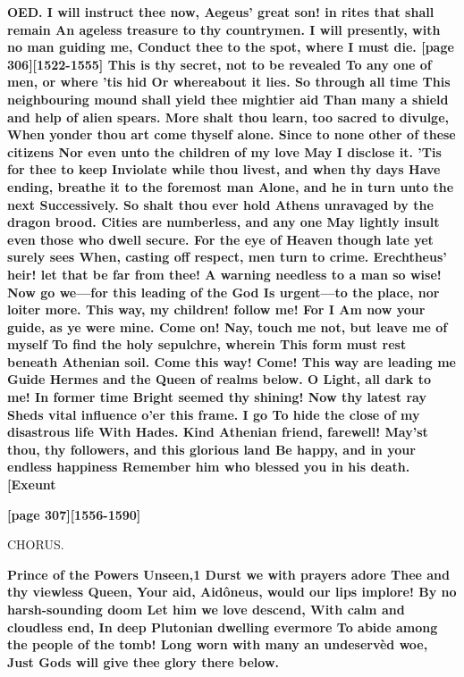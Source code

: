 \documentclass[11pt,letter]{book}
\begin{document}
\par \textbf{OED. I will instruct thee now, Aegeus’ great son! in rites that shall remain An ageless treasure to thy countrymen. I will presently, with no man guiding me, Conduct thee to the spot, where I must die. [page 306][1522-1555] This is thy secret, not to be revealed To any one of men, or where ’tis hid Or whereabout it lies. So through all time This neighbouring mound shall yield thee mightier aid Than many a shield and help of alien spears. More shalt thou learn, too sacred to divulge, When yonder thou art come thyself alone. Since to none other of these citizens Nor even unto the children of my love May I disclose it. ’Tis for thee to keep Inviolate while thou livest, and when thy days Have ending, breathe it to the foremost man Alone, and he in turn unto the next Successively. So shalt thou ever hold Athens unravaged by the dragon brood. Cities are numberless, and any one May lightly insult even those who dwell secure. For the eye of Heaven though late yet surely sees When, casting off respect, men turn to crime. Erechtheus’ heir! let that be far from thee! A warning needless to a man so wise! Now go we—for this leading of the God Is urgent—to the place, nor loiter more. This way, my children! follow me! For I Am now your guide, as ye were mine. Come on! Nay, touch me not, but leave me of myself To find the holy sepulchre, wherein This form must rest beneath Athenian soil. Come this way! Come! This way are leading me Guide Hermes and the Queen of realms below. O Light, all dark to me! In former time Bright seemed thy shining! Now thy latest ray Sheds vital influence o’er this frame. I go To hide the close of my disastrous life With Hades. Kind Athenian friend, farewell! May’st thou, thy followers, and this glorious land Be happy, and in your endless happiness Remember him who blessed you in his death.[Exeunt}
\par 

\par \textbf{[page 307][1556-1590]}
\par 

\par  CHORUS.

\par \textbf{Prince of the Powers Unseen,1 Durst we with prayers adore Thee and thy viewless Queen, Your aid, Aidôneus, would our lips implore! By no harsh-sounding doom Let him we love descend, With calm and cloudless end, In deep Plutonian dwelling evermore To abide among the people of the tomb! Long worn with many an undeservèd woe, Just Gods will give thee glory there below.}
\par 
\end{document}
